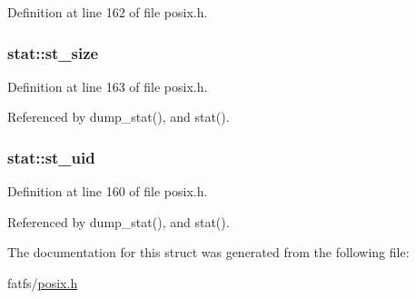 Definition at line 162 of file posix.\-h.

\hypertarget{structstat_a040e19c8b9766f841fde8786ce9297bf}{
\subsubsection[{st\-\_\-size}]{ stat\-::st\-\_\-size}}\label{structstat_a040e19c8b9766f841fde8786ce9297bf}


Definition at line 163 of file posix.\-h.



Referenced by dump\-\_\-stat(), and stat().

\hypertarget{structstat_a4a8708a3d18be60ee7b2f06c4cab0c70}{
\subsubsection[{st\-\_\-uid}]{ stat\-::st\-\_\-uid}}\label{structstat_a4a8708a3d18be60ee7b2f06c4cab0c70}


Definition at line 160 of file posix.\-h.



Referenced by dump\-\_\-stat(), and stat().



The documentation for this struct was generated from the following file\-:\begin{DoxyCompactItemize}
\item 
fatfs/\hyperlink{posix_8h}{posix.\-h}\end{DoxyCompactItemize}
